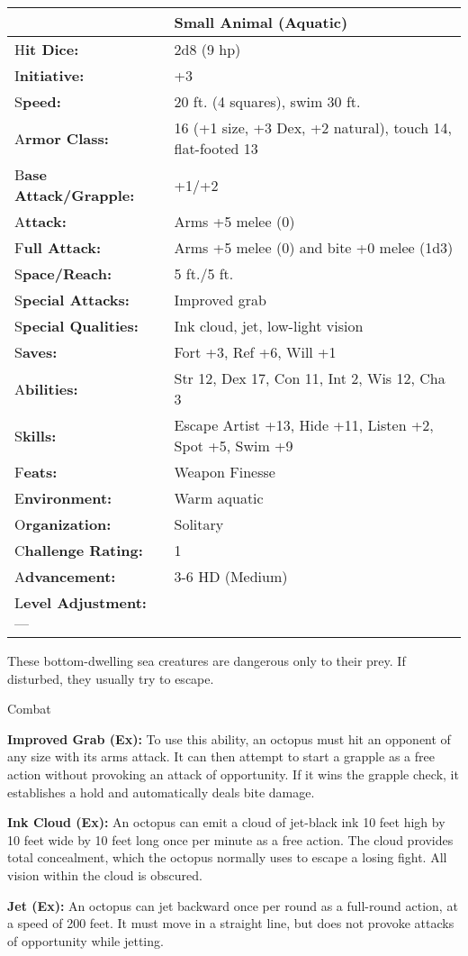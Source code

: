 \documentclass{article}
\begin{document}
\begin{tabular}{|>{\raggedright}p{91pt}|>{\raggedright}p{234pt}|}
\hline
  & Small Animal (Aquatic)\tabularnewline
\hline
H\textbf{it Dice:} & 2d8 (9 hp)\tabularnewline
\hline
I\textbf{nitiative:} & +3\tabularnewline
\hline
S\textbf{peed:} & 20 ft. (4 squares), swim 30 ft.\tabularnewline
\hline
A\textbf{rmor Class:} & 16 (+1 size, +3 Dex, +2 natural), touch 14, flat-footed 
13\tabularnewline
\hline
B\textbf{ase Attack/Grapple:} & +1/+2\tabularnewline
\hline
A\textbf{ttack:} & Arms +5 melee (0)\tabularnewline
\hline
F\textbf{ull Attack:} & Arms +5 melee (0) and bite +0 melee (1d3)\tabularnewline
\hline
S\textbf{pace/Reach:} & 5 ft./5 ft.\tabularnewline
\hline
S\textbf{pecial Attacks:} & Improved grab\tabularnewline
\hline
S\textbf{pecial Qualities:} & Ink cloud, jet, low-light vision\tabularnewline
\hline
S\textbf{aves:} & Fort +3, Ref +6, Will +1\tabularnewline
\hline
A\textbf{bilities:} & Str 12, Dex 17, Con 11, Int 2, Wis 12, Cha 3\tabularnewline
\hline
S\textbf{kills:} & Escape Artist +13, Hide +11, Listen +2, Spot +5, Swim +9\tabularnewline
\hline
F\textbf{eats:} & Weapon Finesse\tabularnewline
\hline
E\textbf{nvironment:} & Warm aquatic\tabularnewline
\hline
O\textbf{rganization:} & Solitary\tabularnewline
\hline
C\textbf{hallenge Rating:} & 1\tabularnewline
\hline
A\textbf{dvancement:} & 3-6 HD (Medium)\tabularnewline
\hline
L\textbf{evel Adjustment:}--- & \tabularnewline
\hline
\end{tabular}

These bottom-dwelling sea creatures are dangerous only to their prey. If disturbed, 
they usually try to escape.

Combat

\textbf{Improved Grab (Ex):} To use this ability, an octopus must hit an opponent 
of any size with its arms attack. It can then attempt to start a grapple as a free 
action without provoking an attack of opportunity. If it wins the grapple check, 
it establishes a hold and automatically deals bite damage.

\textbf{Ink Cloud (Ex):} An octopus can emit a cloud of jet-black ink 10 feet high 
by 10 feet wide by 10 feet long once per minute as a free action. The cloud provides 
total concealment, which the octopus normally uses to escape a losing fight. All 
vision within the cloud is obscured.

\textbf{Jet (Ex):} An octopus can jet backward once per round as a full-round action, 
at a speed of 200 feet. It must move in a straight line, but does not provoke attacks 
of opportunity while jetting.
\end{document}
